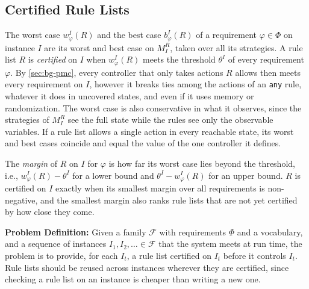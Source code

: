 \subsection{Certified Rule Lists}
\label{sec:certified}

The worst case $w_\varphi^I(R)$ and the best case $b_\varphi^I(R)$ of a requirement $\varphi \in \Phi$ on instance $I$ are its worst and best case on $M_I^R$, taken over all its strategies.
A rule list $R$ is \textit{certified} on $I$ when $w_\varphi^I(R)$ meets the threshold $\theta^I$ of every requirement $\varphi$.
By \autoref{sec:bg-pmc}, every controller that only takes actions $R$ allows then meets every requirement on $I$, however it breaks ties among the actions of an \texttt{any} rule, whatever it does in uncovered states, and even if it uses memory or randomization.
The worst case is also conservative in what it observes, since the strategies of $M_I^R$ see the full state while the rules see only the observable variables.
If a rule list allows a single action in every reachable state, its worst and best cases coincide and equal the value of the one controller it defines.

The \textit{margin} of $R$ on $I$ for $\varphi$ is how far its worst case lies beyond the threshold, i.e., $w_\varphi^I(R) - \theta^I$ for a lower bound and $\theta^I - w_\varphi^I(R)$ for an upper bound.
$R$ is certified on $I$ exactly when its smallest margin over all requirements is non-negative, and the smallest margin also ranks rule lists that are not yet certified by how close they come.

\textbf{Problem Definition:}
Given a family $\mathcal{F}$ with requirements $\Phi$ and a vocabulary, and a sequence of instances $I_1, I_2, \ldots \in \mathcal{F}$ that the system meets at run time, the problem is to provide, for each $I_t$, a rule list certified on $I_t$ before it controls $I_t$.
Rule lists should be reused across instances wherever they are certified, since checking a rule list on an instance is cheaper than writing a new one.
